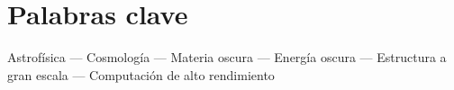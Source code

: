 


\section{Palabras clave}

Astrof\'isica --- Cosmolog\'ia --- Materia oscura --- Energ\'ia oscura
--- Estructura a gran escala --- Computaci\'on de alto rendimiento 
